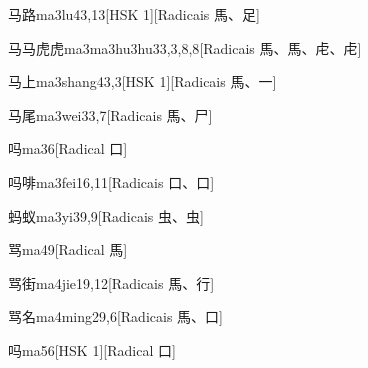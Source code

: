 \begin{entry}{马路}{ma3lu4}{3,13}[HSK 1][Radicais ⾺、⾜]
\end{entry}

\begin{entry}{马马虎虎}{ma3ma3hu3hu3}{3,3,8,8}[Radicais ⾺、⾺、⾌、⾌]
\end{entry}

\begin{entry}{马上}{ma3shang4}{3,3}[HSK 1][Radicais ⾺、⼀]
\end{entry}

\begin{entry}{马尾}{ma3wei3}{3,7}[Radicais ⾺、⼫]
\end{entry}

\begin{entry}{吗}{ma3}{6}[Radical ⼝]
\end{entry}

\begin{entry*}{吗啡}{ma3fei1}{6,11}[Radicais ⼝、⼝]
\end{entry*}

\begin{entry}{蚂蚁}{ma3yi3}{9,9}[Radicais ⾍、⾍]
\end{entry}

\begin{entry}{骂}{ma4}{9}[Radical ⾺]
\end{entry}

\begin{entry}{骂街}{ma4jie1}{9,12}[Radicais ⾺、⾏]
\end{entry}

\begin{entry}{骂名}{ma4ming2}{9,6}[Radicais ⾺、⼝]
\end{entry}

\begin{entry}{吗}{ma5}{6}[HSK 1][Radical ⼝]
\end{entry}

